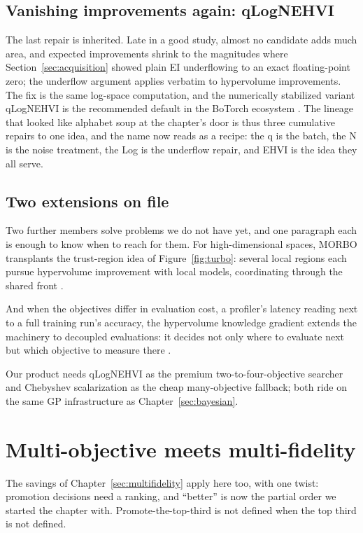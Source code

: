 \subsection{Vanishing improvements again: qLogNEHVI}

The last repair is inherited. Late in a good study, almost no
candidate adds much area, and expected improvements shrink to the
magnitudes where Section~\ref{sec:acquisition} showed plain EI
underflowing to an exact floating-point zero; the underflow argument
applies verbatim to hypervolume improvements. The fix is the same
log-space computation, and the numerically stabilized variant
qLogNEHVI is the recommended default in the BoTorch ecosystem
\citep{ament2023logei}. The lineage that looked like alphabet soup at
the chapter's door is thus three cumulative repairs to one idea, and
the name now reads as a recipe: the q is the batch, the N is the noise
treatment, the Log is the underflow repair, and EHVI is the idea they
all serve.

\subsection{Two extensions on file}

Two further members solve problems we do not have yet, and one
paragraph each is enough to know when to reach for them. For
high-dimensional spaces, MORBO transplants the trust-region idea of
Figure~\ref{fig:turbo}: several local regions each pursue
hypervolume improvement with local models, coordinating through the
shared front \citep{daulton2022morbo}.

And when the objectives differ in evaluation cost, a profiler's
latency reading next to a full training run's accuracy, the
hypervolume knowledge gradient extends the machinery to decoupled
evaluations: it decides not only where to evaluate next but which
objective to measure there \citep{daulton2023hvkg}.

Our product needs qLogNEHVI as the premium
two-to-four-objective searcher and Chebyshev scalarization as the
cheap many-objective fallback; both ride on the same GP
infrastructure as Chapter~\ref{sec:bayesian}.

\section{Multi-objective meets multi-fidelity}

The savings of Chapter~\ref{sec:multifidelity} apply here too, with one
twist: promotion decisions need a ranking, and ``better'' is now the
partial order we started the chapter with. Promote-the-top-third is not
defined when the top third is not defined.

